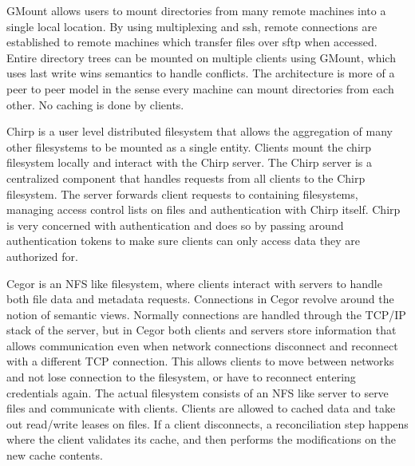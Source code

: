 GMount \cite{Dun2009} allows users to mount directories from many remote
machines into a single local location. By using multiplexing and ssh, remote
connections are established to remote machines which transfer files over sftp
when accessed. Entire directory trees can be mounted on multiple clients using
GMount, which uses last write wins semantics to handle conflicts. The
architecture is more of a peer to peer model in the sense every machine can
mount directories from each other. No caching is done by clients.


Chirp \cite{Donnelly2012} is a user level distributed filesystem that allows
the aggregation of many other filesystems to be mounted as a single entity.
Clients mount the chirp filesystem locally and interact with the Chirp server.
The Chirp server is a centralized component that handles requests from all
clients to the Chirp filesystem. The server forwards client requests to
containing filesystems, managing access control lists on files and
authentication with Chirp itself. Chirp is very concerned with authentication
and does so by passing around authentication tokens to make sure clients can
only access data they are authorized for.


Cegor \cite{Shi2004} is an NFS like filesystem, where clients interact with
servers to handle both file data and metadata requests. Connections in Cegor
revolve around the notion of semantic views. Normally connections are handled
through the TCP/IP stack of the server, but in Cegor both clients and servers
store information that allows communication even when network connections
disconnect and reconnect with a different TCP connection. This allows clients
to move between networks and not lose connection to the filesystem, or have to
reconnect entering credentials again. The actual filesystem consists of an NFS
like server to serve files and communicate with clients. Clients are allowed
to cached data and take out read/write leases on files. If a client
disconnects, a reconciliation step happens where the client validates its
cache, and then performs the modifications on the new cache contents.